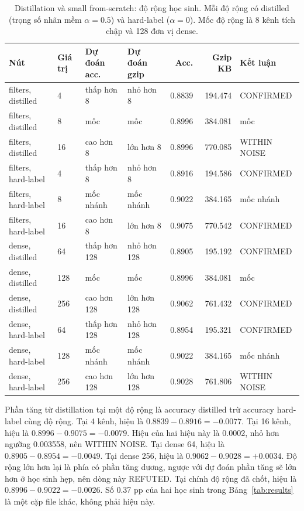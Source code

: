 \documentclass[13pt,a4paper]{article}
\begin{document}
\begin{table}[H]
\centering
\caption{Distillation và small from-scratch: độ rộng học sinh. Mỗi độ rộng có distilled (trọng số nhãn mềm \(\alpha=0.5\)) và hard-label (\(\alpha=0\)). Mốc độ rộng là 8 kênh tích chập và 128 đơn vị dense.}
\label{tab:sweep-width}
\begin{tabular}{|l|l|l|l|r|r|l|}
\hline
Nút & Giá trị & Dự đoán acc. & Dự đoán gzip & Acc. & Gzip KB & Kết luận \\ \hline
filters, distilled & 4 & thấp hơn 8 & nhỏ hơn 8 & 0.8839 & 194.474 & CONFIRMED \\ \hline
filters, distilled & 8 & mốc & mốc & 0.8996 & 384.081 & mốc \\ \hline
filters, distilled & 16 & cao hơn 8 & lớn hơn 8 & 0.8996 & 770.085 & WITHIN NOISE \\ \hline
filters, hard-label & 4 & thấp hơn 8 & nhỏ hơn 8 & 0.8916 & 194.586 & CONFIRMED \\ \hline
filters, hard-label & 8 & mốc nhánh & mốc nhánh & 0.9022 & 384.165 & mốc nhánh \\ \hline
filters, hard-label & 16 & cao hơn 8 & lớn hơn 8 & 0.9075 & 770.542 & CONFIRMED \\ \hline
dense, distilled & 64 & thấp hơn 128 & nhỏ hơn 128 & 0.8905 & 195.192 & CONFIRMED \\ \hline
dense, distilled & 128 & mốc & mốc & 0.8996 & 384.081 & mốc \\ \hline
dense, distilled & 256 & cao hơn 128 & lớn hơn 128 & 0.9062 & 761.432 & CONFIRMED \\ \hline
dense, hard-label & 64 & thấp hơn 128 & nhỏ hơn 128 & 0.8954 & 195.321 & CONFIRMED \\ \hline
dense, hard-label & 128 & mốc nhánh & mốc nhánh & 0.9022 & 384.165 & mốc nhánh \\ \hline
dense, hard-label & 256 & cao hơn 128 & lớn hơn 128 & 0.9028 & 761.806 & WITHIN NOISE \\ \hline
\end{tabular}
\end{table}

Phần tăng từ distillation tại một độ rộng là accuracy distilled trừ accuracy hard-label cùng độ rộng.
Tại 4 kênh, hiệu là \(0.8839-0.8916=-0.0077\).
Tại 16 kênh, hiệu là \(0.8996-0.9075=-0.0079\).
Hiệu của hai hiệu này là 0.0002, nhỏ hơn ngưỡng 0.003558, nên WITHIN NOISE.
Tại dense 64, hiệu là \(0.8905-0.8954=-0.0049\).
Tại dense 256, hiệu là \(0.9062-0.9028=+0.0034\).
Độ rộng lớn hơn lại là phía có phần tăng dương, ngược với dự đoán phần tăng sẽ lớn hơn ở học sinh hẹp, nên dòng này REFUTED.
Tại chính độ rộng đã chốt, hiệu là \(0.8996-0.9022=-0.0026\).
Số 0.37 pp của hai học sinh trong Bảng~\ref{tab:results} là một cặp file khác, không phải hiệu này.
\end{document}

